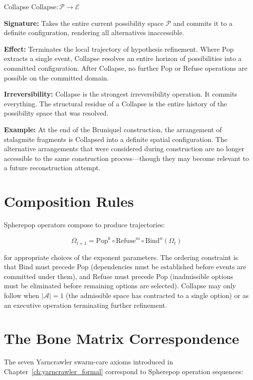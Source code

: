 \begin{definition}{Collapse}
$\mathrm{Collapse}: \mathcal{P} \to \mathcal{E}$

\textbf{Signature:} Takes the entire current possibility space $\mathcal{P}$
and commits it to a definite configuration, rendering all alternatives inaccessible.

\textbf{Effect:} Terminates the local trajectory of hypothesis refinement. Where
Pop extracts a single event, Collapse resolves an entire horizon of possibilities
into a committed configuration. After Collapse, no further Pop or Refuse operations
are possible on the committed domain.

\textbf{Irreversibility:} Collapse is the strongest irreversibility operation.
It commits everything. The structural residue of a Collapse is the entire history
of the possibility space that was resolved.

\textbf{Example:} At the end of the Bruniquel construction, the arrangement of
stalagmite fragments is Collapsed into a definite spatial configuration. The
alternative arrangements that were considered during construction are no longer
accessible to the same construction process---though they may become relevant to
a future reconstruction attempt.
\end{definition}

\section{Composition Rules}

Spherepop operators compose to produce \KES trajectories:

\[
  \Omega_{t+1} = \mathrm{Pop}^{k} \circ \mathrm{Refuse}^{m} \circ
  \mathrm{Bind}^{n} (\Omega_t)
\]

for appropriate choices of the exponent parameters. The ordering constraint is
that Bind must precede Pop (dependencies must be established before events are
committed under them), and Refuse must precede Pop (inadmissible options must
be eliminated before remaining options are selected). Collapse may only follow
when $|\mathcal{A}| = 1$ (the admissible space has contracted to a single option)
or as an executive operation terminating further refinement.

\section{The Bone Matrix Correspondence}

The seven Yarncrawler swarm-care axioms introduced in
Chapter~\ref{ch:yarncrawler_formal} correspond to Spherepop operation sequences:

